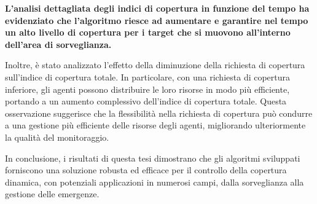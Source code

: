 \documentclass[twoside]{article}
\begin{document}
\vspace{\baselineskip}

\textbf{L'analisi dettagliata degli indici di copertura in funzione del tempo ha evidenziato che l'algoritmo riesce ad aumentare e garantire nel tempo un alto livello di copertura per i target che si muovono all'interno dell'area di sorveglianza.}

\vspace{\baselineskip}

Inoltre, è stato analizzato l'effetto della diminuzione della richiesta di copertura sull'indice di copertura totale. In particolare, con una richiesta di copertura inferiore, gli agenti possono distribuire le loro risorse in modo più efficiente, portando a un aumento complessivo dell'indice di copertura totale. Questa osservazione suggerisce che la flessibilità nella richiesta di copertura può condurre a una gestione più efficiente delle risorse degli agenti, migliorando ulteriormente la qualità del monitoraggio.

\vspace{\baselineskip}

In conclusione, i risultati di questa tesi dimostrano che gli algoritmi sviluppati forniscono una soluzione robusta ed efficace per il controllo della copertura dinamica, con potenziali applicazioni in numerosi campi, dalla sorveglianza alla gestione delle emergenze.

\newpage
\end{document}
